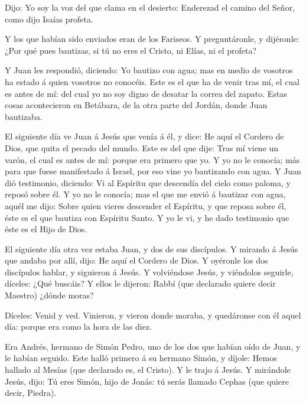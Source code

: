  Dijo: Yo soy la voz del que clama en el desierto:
Enderezad el camino del Señor, como dijo Isaías profeta.

 Y los que habían sido enviados eran de los Fariseos.
 Y preguntáronle, y dijéronle: ¿Por qué pues bautizas, si
tú no eres el Cristo, ni Elías, ni el profeta?

 Y Juan les respondió, diciendo: Yo bautizo con agua; mas
en medio de vosotros ha estado á quien vosotros no conocéis.
 Este es el que ha de venir tras mí, el cual es antes de
mí: del cual yo no soy digno de desatar la correa del zapato.
 Estas cosas acontecieron en Betábara, de la otra parte del
Jordán, donde Juan bautizaba.

 El siguiente día ve Juan á Jesús que venía á él, y dice:
He aquí el Cordero de Dios, que quita el pecado del mundo. 
Este es del que dije: Tras mí viene un varón, el cual es antes de mí:
porque era primero que yo.  Y yo no le conocía; más para
que fuese manifestado á Israel, por eso vine yo bautizando con agua.
 Y Juan dió testimonio, diciendo: Vi al Espíritu que
descendía del cielo como paloma, y reposó sobre él.  Y yo
no le conocía; mas el que me envió á bautizar con agua, aquél me dijo:
Sobre quien vieres descender el Espíritu, y que reposa sobre él, éste es
el que bautiza con Espíritu Santo.  Y yo le vi, y he dado
testimonio que éste es el Hijo de Dios.

 El siguiente día otra vez estaba Juan, y dos de sus
discípulos.  Y mirando á Jesús que andaba por allí, dijo:
He aquí el Cordero de Dios.  Y oyéronle los dos discípulos
hablar, y siguieron á Jesús.  Y volviéndose Jesús, y
viéndolos seguirle, díceles: ¿Qué buscáis? Y ellos le dijeron: Rabbí
(que declarado quiere decir Maestro) ¿dónde moras?

 Díceles: Venid y ved. Vinieron, y vieron donde moraba, y
quedáronse con él aquel día: porque era como la hora de las diez.

 Era Andrés, hermano de Simón Pedro, uno de los dos que
habían oído de Juan, y le habían seguido.  Este halló
primero á su hermano Simón, y díjole: Hemos hallado al Mesías (que
declarado es, el Cristo).  Y le trajo á Jesús. Y mirándole
Jesús, dijo: Tú eres Simón, hijo de Jonás: tú serás llamado Cephas (que
quiere decir, Piedra).

